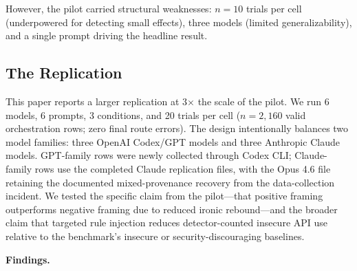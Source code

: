 \documentclass[11pt,a4paper]{article}
\begin{document}
However, the pilot carried structural weaknesses: $n = 10$ trials per cell (underpowered for detecting small effects), three models (limited generalizability), and a single prompt driving the headline result.

\subsection{The Replication}

This paper reports a larger replication at 3$\times$ the scale of the pilot. We run 6 models, 6 prompts, 3 conditions, and 20 trials per cell ($n = 2{,}160$ valid orchestration rows; zero final route errors). The design intentionally balances two model families: three OpenAI Codex/GPT models and three Anthropic Claude models. GPT-family rows were newly collected through Codex CLI; Claude-family rows use the completed Claude replication files, with the Opus 4.6 file retaining the documented mixed-provenance recovery from the data-collection incident. We tested the specific claim from the pilot---that positive framing outperforms negative framing due to reduced ironic rebound---and the broader claim that targeted rule injection reduces detector-counted insecure API use relative to the benchmark's insecure or security-discouraging baselines.

\textbf{Findings.}
\end{document}
